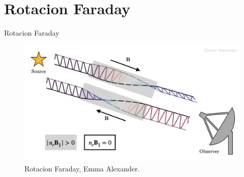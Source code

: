 \documentclass[xetex,aspectratio=169]{beamer}
\begin{document}
	\section{Rotacion Faraday}
	\begin{frame}{Rotacion Faraday}
		\begin{figure}
			\centering
			\includegraphics[width=.8\textwidth, keepaspectratio]{figures/faraday_rotation/faraday_rot.png}
			\caption*{Rotacion Faraday, Emma Alexander.}
		\end{figure}
	\end{frame}
\end{document}
